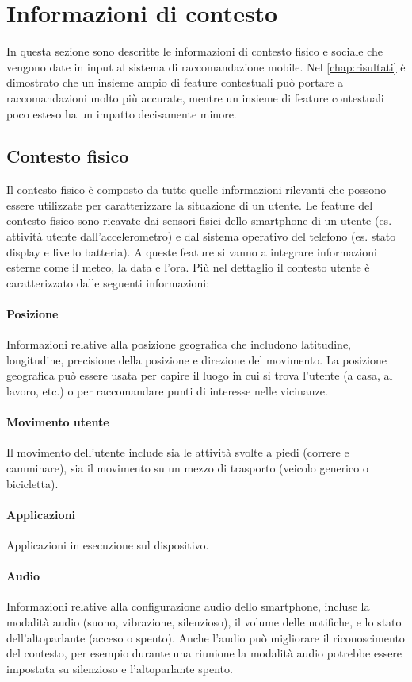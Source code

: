 \documentclass[12pt,italian]{report}
\begin{document}
\section{Informazioni di contesto} \label{sec:context-info}
In questa sezione sono descritte le informazioni di contesto fisico e sociale che vengono date in input al sistema di raccomandazione mobile. Nel \autoref{chap:risultati} è dimostrato che un insieme ampio di feature contestuali può portare a raccomandazioni molto più accurate, mentre un insieme di feature contestuali poco esteso ha un impatto decisamente minore.

\subsection{Contesto fisico}
Il contesto fisico è composto da tutte quelle informazioni rilevanti che possono essere utilizzate per caratterizzare la situazione di un utente. Le feature del contesto fisico sono ricavate dai sensori fisici dello smartphone di un utente (es. attività utente dall'accelerometro) e dal sistema operativo del telefono (es. stato display e livello batteria). A queste feature si vanno a integrare informazioni esterne come il meteo, la data e l'ora. Più nel dettaglio il contesto utente è caratterizzato dalle seguenti informazioni:

\paragraph{Posizione} Informazioni relative alla posizione geografica che includono latitudine, longitudine, precisione della posizione e direzione del movimento. La posizione geografica può essere usata per capire il luogo in cui si trova l'utente (a casa, al lavoro, etc.) o per raccomandare punti di interesse nelle vicinanze.

\paragraph{Movimento utente} Il movimento dell'utente include sia le attività svolte a piedi (correre e camminare), sia il movimento su un mezzo di trasporto (veicolo generico o bicicletta).

\paragraph{Applicazioni} Applicazioni in esecuzione sul dispositivo.

\paragraph{Audio}  Informazioni relative alla configurazione audio dello smartphone, incluse la modalità audio (suono, vibrazione, silenzioso), il volume delle notifiche, e lo stato dell'altoparlante (acceso o spento). Anche l'audio può migliorare il riconoscimento del contesto, per esempio durante una riunione la modalità audio potrebbe essere impostata su silenzioso e l'altoparlante spento.
\end{document}
